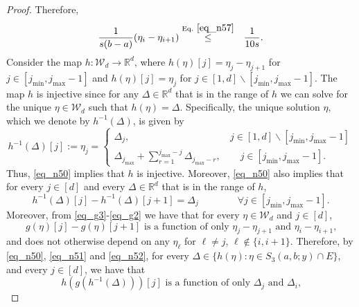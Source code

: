 \documentclass[11pt,letterpaper]{article}
\begin{document}
\begin{proof}
    Therefore,
    \begin{eqnarray}\label{eq_n30}
    \frac{1}{s (b-a)}(\eta_{i}- \eta_{i+1}) &\stackrel{\textrm{Eq. } \eqref{eq_n57}}{\leq} & \frac{1}{10 s}.
    \end{eqnarray}
Consider the map $h: \mathcal{W}_{d} \rightarrow \mathbb{R}^{d}$, where   $h(\eta)[j] = \eta_j - \eta_{j+1}$ for $j \in[j_{\mathrm{min}}, j_{\mathrm{max}} -1]$ and $h(\eta)[j] = \eta_{j}$ for $j \in [1,d] \backslash [j_{\mathrm{min}}, j_{\mathrm{max}} -1]$.
%
%
The map $h$ is injective since for any $\Delta \in \mathbb{R}^d$ that is in the range of $h$ we can solve for the unique $\eta \in \mathcal{W}_d$ such that $h(\eta) = \Delta$.
 Specifically, the unique solution $\eta$, which we denote by $h^{-1}(\Delta)$, is given by 
 \begin{equation}\label{eq_n50}
 h^{-1}(\Delta)[j] := \eta_j = \begin{cases}
  \Delta_j, \qquad \qquad \qquad \qquad \qquad \, \,   j \in [1,d] \backslash [j_{\mathrm{min}}, j_{\mathrm{max}} -1]\\
  \Delta_{j_\mathrm{max}} + \sum_{r = 1}^{ j_{\mathrm{max}} - j} \Delta_{j_{\mathrm{max}} - r}, \qquad   j \in[j_{\mathrm{min}}, j_{\mathrm{max}} -1].
%
 \end{cases}
 \end{equation}
 Thus, \eqref{eq_n50} implies that $h$ is injective.
  Moreover,   \eqref{eq_n50} also implies that for every $j \in [d]$ and every $\Delta \in \mathbb{R}^d$ that is in the range of $h$,
  \begin{equation}\label{eq_n51}
  h^{-1}(\Delta)[j]- h^{-1}(\Delta)[j+1] = \Delta_j \qquad \qquad \forall  j \in[j_{\mathrm{min}}, j_{\mathrm{max}} -1].
    \end{equation}
Moreover, from \eqref{eq_g3}-\eqref{eq_g2} we have that for every $\eta \in \mathcal{W}_d$ and $j \in [d]$,
\begin{equation}\label{eq_n52}
\textrm{$g(\eta)[j]- g(\eta)[j+1]$ is a function of only $\eta_j- \eta_{j+1}$ and $\eta_i - \eta_{i+1}$,}
\end{equation}
%
and does not otherwise depend on any $\eta_\ell$ for $\ell \neq j$, $\ell \notin \{i, i+1 \}$.
%
Therefore, by \eqref{eq_n50}, \eqref{eq_n51} and \eqref{eq_n52},  for every $\Delta \in  \{h(\eta) :  \eta \in  S_3(a,b;y) \cap E \}$, and every $j \in [d]$, we have that 
%
\begin{equation}\label{eq_n53}
\textrm{$h(g(h^{-1}(\Delta)))[j]$ is a function of only $\Delta_j$ and $\Delta_i$,}

\end{equation}
\end{proof}
\end{document}
